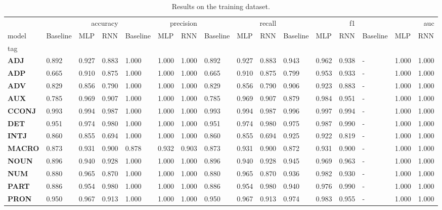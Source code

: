 \begin{table}
\caption{Results on the training dataset.}
\label{tab::ex_2_train}
\begin{tabular}{|l||l||l||l||l||l||l||l||l||l||l||l||l||l||l||l|}
\toprule
 & \multicolumn{3}{r}{accuracy} & \multicolumn{3}{r}{precision} & \multicolumn{3}{r}{recall} & \multicolumn{3}{r}{f1} & \multicolumn{3}{r}{auc} \\
model & Baseline & MLP & RNN & Baseline & MLP & RNN & Baseline & MLP & RNN & Baseline & MLP & RNN & Baseline & MLP & RNN \\
tag &  &  &  &  &  &  &  &  &  &  &  &  &  &  &  \\
\midrule
\textbf{ADJ} & 0.892 & 0.927 & 0.883 & 1.000 & 1.000 & 1.000 & 0.892 & 0.927 & 0.883 & 0.943 & 0.962 & 0.938 & - & 1.000 & 1.000 \\
\textbf{ADP} & 0.665 & 0.910 & 0.875 & 1.000 & 1.000 & 1.000 & 0.665 & 0.910 & 0.875 & 0.799 & 0.953 & 0.933 & - & 1.000 & 1.000 \\
\textbf{ADV} & 0.829 & 0.856 & 0.790 & 1.000 & 1.000 & 1.000 & 0.829 & 0.856 & 0.790 & 0.906 & 0.923 & 0.883 & - & 1.000 & 1.000 \\
\textbf{AUX} & 0.785 & 0.969 & 0.907 & 1.000 & 1.000 & 1.000 & 0.785 & 0.969 & 0.907 & 0.879 & 0.984 & 0.951 & - & 1.000 & 1.000 \\
\textbf{CCONJ} & 0.993 & 0.994 & 0.987 & 1.000 & 1.000 & 1.000 & 0.993 & 0.994 & 0.987 & 0.996 & 0.997 & 0.994 & - & 1.000 & 1.000 \\
\textbf{DET} & 0.951 & 0.974 & 0.980 & 1.000 & 1.000 & 1.000 & 0.951 & 0.974 & 0.980 & 0.975 & 0.987 & 0.990 & - & 1.000 & 1.000 \\
\textbf{INTJ} & 0.860 & 0.855 & 0.694 & 1.000 & 1.000 & 1.000 & 0.860 & 0.855 & 0.694 & 0.925 & 0.922 & 0.819 & - & 1.000 & 1.000 \\
\textbf{MACRO} & 0.873 & 0.931 & 0.900 & 0.878 & 0.932 & 0.903 & 0.873 & 0.931 & 0.900 & 0.872 & 0.931 & 0.900 & - & 1.000 & 1.000 \\
\textbf{NOUN} & 0.896 & 0.940 & 0.928 & 1.000 & 1.000 & 1.000 & 0.896 & 0.940 & 0.928 & 0.945 & 0.969 & 0.963 & - & 1.000 & 1.000 \\
\textbf{NUM} & 0.880 & 0.965 & 0.870 & 1.000 & 1.000 & 1.000 & 0.880 & 0.965 & 0.870 & 0.936 & 0.982 & 0.930 & - & 1.000 & 1.000 \\
\textbf{PART} & 0.886 & 0.954 & 0.980 & 1.000 & 1.000 & 1.000 & 0.886 & 0.954 & 0.980 & 0.940 & 0.976 & 0.990 & - & 1.000 & 1.000 \\
\textbf{PRON} & 0.950 & 0.967 & 0.913 & 1.000 & 1.000 & 1.000 & 0.950 & 0.967 & 0.913 & 0.974 & 0.983 & 0.955 & - & 1.000 & 1.000 \\

\end{tabular}
\end{table}
